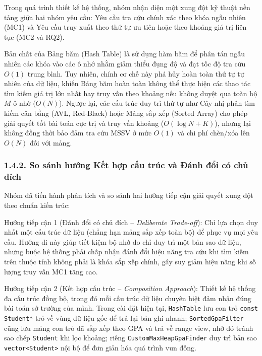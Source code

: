 \documentclass[14pt,a4paper]{extarticle}
\begin{document}
Trong quá trình thiết kế hệ thống, nhóm nhận diện một xung đột kỹ thuật nền tảng giữa hai nhóm yêu cầu: Yêu cầu tra cứu chính xác theo khóa ngẫu nhiên (MC1) và Yêu cầu truy xuất theo thứ tự ưu tiên hoặc theo khoảng giá trị liên tục (MC2 và RQ2).

Bản chất của Bảng băm (Hash Table) là sử dụng hàm băm để phân tán ngẫu nhiên các khóa vào các ô nhớ nhằm giảm thiểu đụng độ và đạt tốc độ tra cứu $O(1)$ trung bình. Tuy nhiên, chính cơ chế này phá hủy hoàn toàn thứ tự tự nhiên của dữ liệu, khiến Bảng băm hoàn toàn không thể thực hiện các thao tác tìm kiếm giá trị lớn nhất hay truy vấn theo khoảng nếu không duyệt qua toàn bộ $M$ ô nhớ ($O(N)$). Ngược lại, các cấu trúc duy trì thứ tự như Cây nhị phân tìm kiếm cân bằng (AVL, Red-Black) hoặc Mảng sắp xếp (Sorted Array) cho phép giải quyết tốt bài toán cực trị và truy vấn khoảng ($O(\log N + K)$), nhưng lại không đồng thời bảo đảm tra cứu MSSV ở mức $O(1)$ và chi phí chèn/xóa lên $O(N)$ đối với mảng.

\subsubsection*{1.4.2. So sánh hướng Kết hợp cấu trúc và Đánh đổi có chủ đích}
{}

Nhóm đã tiến hành phân tích và so sánh hai hướng tiếp cận giải quyết xung đột theo chuẩn kiến trúc:

Hướng tiếp cận 1 (Đánh đổi có chủ đích -- \textit{Deliberate Trade-off}): Chỉ lựa chọn duy nhất một cấu trúc dữ liệu (chẳng hạn mảng sắp xếp toàn bộ) để phục vụ mọi yêu cầu. Hướng đi này giúp tiết kiệm bộ nhớ do chỉ duy trì một bản sao dữ liệu, nhưng buộc hệ thống phải chấp nhận đánh đổi hiệu năng tra cứu khi tìm kiếm trên thuộc tính không phải là khóa sắp xếp chính, gây suy giảm hiệu năng khi số lượng truy vấn MC1 tăng cao.

Hướng tiếp cận 2 (Kết hợp cấu trúc -- \textit{Composition Approach}): Thiết kế hệ thống đa cấu trúc đồng bộ, trong đó mỗi cấu trúc dữ liệu chuyên biệt đảm nhận đúng bài toán sở trường của mình. Trong cài đặt hiện tại, \texttt{HashTable} lưu con trỏ \texttt{const Student*} trỏ về vùng dữ liệu gốc để trả lại bản ghi nhanh; \texttt{SortedGpaFilter} cũng lưu mảng con trỏ đã sắp xếp theo GPA và trả về range view, nhờ đó tránh sao chép \texttt{Student} khi lọc khoảng; riêng \texttt{CustomMaxHeapGpaFinder} duy trì bản sao \texttt{vector<Student>} nội bộ để đơn giản hóa quá trình vun đống.
\end{document}
